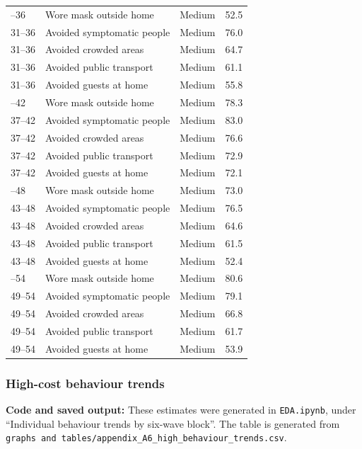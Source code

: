 \documentclass[
  12pt,
  a4paper,
]{article}
\begin{document}
\begin{longtable}[t]{lllr}
\addlinespace
31--36 & Wore mask outside home & Medium & 52.5\\
31--36 & Avoided symptomatic people & Medium & 76.0\\
31--36 & Avoided crowded areas & Medium & 64.7\\
31--36 & Avoided public transport & Medium & 61.1\\
31--36 & Avoided guests at home & Medium & 55.8\\
\addlinespace
37--42 & Wore mask outside home & Medium & 78.3\\
37--42 & Avoided symptomatic people & Medium & 83.0\\
37--42 & Avoided crowded areas & Medium & 76.6\\
37--42 & Avoided public transport & Medium & 72.9\\
37--42 & Avoided guests at home & Medium & 72.1\\
\addlinespace
43--48 & Wore mask outside home & Medium & 73.0\\
43--48 & Avoided symptomatic people & Medium & 76.5\\
43--48 & Avoided crowded areas & Medium & 64.6\\
43--48 & Avoided public transport & Medium & 61.5\\
43--48 & Avoided guests at home & Medium & 52.4\\
\addlinespace
49--54 & Wore mask outside home & Medium & 80.6\\
49--54 & Avoided symptomatic people & Medium & 79.1\\
49--54 & Avoided crowded areas & Medium & 66.8\\
49--54 & Avoided public transport & Medium & 61.7\\
49--54 & Avoided guests at home & Medium & 53.9\\
\bottomrule
\end{longtable}

\subsubsection{High-cost behaviour trends}\label{high-cost-behaviour-trends}

\textbf{Code and saved output:} These estimates were generated in
\texttt{EDA.ipynb}, under ``Individual behaviour trends by six-wave block''. The
table is generated from
\texttt{graphs\ and\ tables/appendix\_A6\_high\_behaviour\_trends.csv}.
\end{document}
